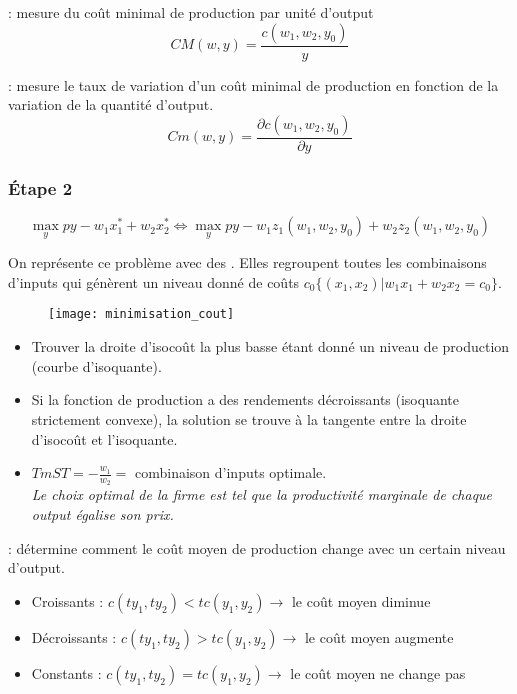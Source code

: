  : mesure du coût minimal de production par unité d'output
\begin{equation*}
CM(w,y) = \frac{c(w_1, w_2, y_0)}{y}
\end{equation*}

 : mesure le taux de variation d'un coût minimal de production en fonction de la variation de la quantité d'output.
\begin{equation*}
Cm(w,y) = \frac{\partial c(w_1, w_2, y_0)}{\partial y}
\end{equation*}

\subsubsection{Étape 2}

\begin{equation*}
\max_y py - w_1x^*_1 + w_2x^*_2 \Longleftrightarrow \max_y py - w_1z_1(w_1,w_2,y_0) + w_2 z_2 (w_1, w_2, y_0)
\end{equation*}

On représente ce problème avec des . Elles regroupent toutes les combinaisons d'inputs qui génèrent un niveau donné de coûts $c_0 \{(x_1, x_2)|w_1x_1 + w_2x_2 = c_0\}$.

\begin{figure}[H]
	\centering
	\texttt{[image: minimisation\_cout]}
\end{figure}

\begin{itemize}
\item Trouver la droite d'isocoût la plus basse étant donné un niveau de production (courbe d'isoquante).
\item Si la fonction de production a des rendements décroissants (isoquante strictement convexe), la solution se trouve à la tangente entre la droite d'isocoût et l'isoquante.
\item $TmST = -\frac{w_1}{w_2} =$ combinaison d'inputs optimale.\\
\textit{Le choix optimal de la firme est tel que la productivité marginale de chaque output égalise son prix.}
\end{itemize}

 : détermine comment le coût moyen de production change avec un certain niveau d'output.
\begin{itemize}
\item Croissants : $c(ty_1, ty_2) < tc(y_1, y_2) \rightarrow$ le coût moyen diminue
\item Décroissants : $c(ty_1, ty_2) > tc(y_1, y_2) \rightarrow$ le coût moyen augmente
\item Constants : $c(ty_1, ty_2) = tc(y_1, y_2) \rightarrow$ le coût moyen ne change pas
\end{itemize}

